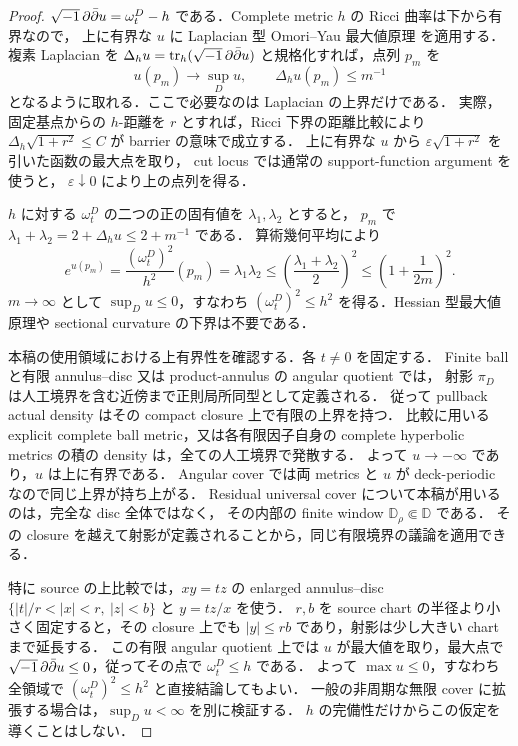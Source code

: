 \documentclass[a4paper,11pt]{ltjsarticle}
\numberwithin{equation}{section}
\theoremstyle{plain}
\theoremstyle{definition}
\theoremstyle{remark}
\begin{document}
\begin{proof}
$\sqrt{-1}\,\partial\bar\partial u=\omega_t^D-h$ である．Complete metric $h$ の Ricci 曲率は下から有界なので，
上に有界な $u$ に Laplacian 型 Omori--Yau 最大値原理
\cite[Theorem~1, p.~200]{YauSchwarzThm2} を適用する．
複素 Laplacian を $\Delta_hu=\operatorname{tr}_h(\sqrt{-1}\,\partial\bar\partial u)$ と規格化すれば，点列 $p_m$ を
\[
 u(p_m)\to\sup_Du,
 \qquad
 \Delta_hu(p_m)\le m^{-1}
\]
となるように取れる．ここで必要なのは Laplacian の上界だけである．
実際，固定基点からの $h$-距離を $r$ とすれば，Ricci 下界の距離比較により
$\Delta_h\sqrt{1+r^2}\le C$ が barrier の意味で成立する．
上に有界な $u$ から $\varepsilon\sqrt{1+r^2}$ を引いた函数の最大点を取り，
cut locus では通常の support-function argument を使うと，
$\varepsilon\downarrow0$ により上の点列を得る．

$h$ に対する $\omega_t^D$ の二つの正の固有値を $\lambda_1,\lambda_2$ とすると，
$p_m$ で $\lambda_1+\lambda_2=2+\Delta_hu\le2+m^{-1}$ である．
算術幾何平均により
\[
 e^{u(p_m)}
 =\frac{(\omega_t^D)^2}{h^2}(p_m)
  =\lambda_1\lambda_2
 \le\left(\frac{\lambda_1+\lambda_2}{2}\right)^2
 \le\left(1+\frac1{2m}\right)^2.
\]
$m\to\infty$ として $\sup_Du\le0$，すなわち
$(\omega_t^D)^2\le h^2$ を得る．Hessian 型最大値原理や sectional curvature の下界は不要である．

本稿の使用領域における上有界性を確認する．各 $t\ne0$ を固定する．
Finite ball と有限 annulus--disc 又は product-annulus の angular quotient では，
射影 $\pi_D$ は人工境界を含む近傍まで正則局所同型として定義される．
従って pullback actual density はその compact closure 上で有限の上界を持つ．
比較に用いる explicit complete ball metric，又は各有限因子自身の complete
hyperbolic metrics の積の density は，全ての人工境界で発散する．
よって $u\to-\infty$ であり，$u$ は上に有界である．
Angular cover では両 metrics と $u$ が deck-periodic なので同じ上界が持ち上がる．
Residual universal cover について本稿が用いるのは，完全な disc 全体ではなく，
その内部の finite window $\mathbb D_\rho\Subset\mathbb D$ である．
その closure を越えて射影が定義されることから，同じ有限境界の議論を適用できる．

特に source の上比較では，$xy=tz$ の enlarged annulus--disc
$\{|t|/r<|x|<r,\ |z|<b\}$ と $y=tz/x$ を使う．
$r,b$ を source chart の半径より小さく固定すると，その closure 上でも
$|y|\le rb$ であり，射影は少し大きい chart まで延長する．
この有限 angular quotient 上では $u$ が最大値を取り，最大点で
$\sqrt{-1}\,\partial\bar\partial u\le0$，従ってその点で $\omega_t^D\le h$ である．
よって $\max u\le0$，すなわち全領域で $(\omega_t^D)^2\le h^2$ と直接結論してもよい．
一般の非周期な無限 cover に拡張する場合は，$\sup_Du<\infty$ を別に検証する．
$h$ の完備性だけからこの仮定を導くことはしない．
\end{proof}
\end{document}
